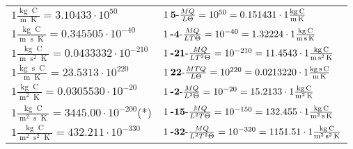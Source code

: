 \begin{center}
\begin{longtable}{l l}
{\color{black}$1 \bm{\mathrm{ }}\frac{\operatorname{kg}\operatorname{C}}{\operatorname{m}\operatorname{K}} = 3.10433\cdot10^{50} $}&
	{\color{black}$1\:\text{\textbf{5}-} \frac{MQ}{L\Theta}=10^{50} = 0.151431 \cdot 1 \bm{\mathrm{ }}\frac{\operatorname{kg}\operatorname{C}}{\operatorname{m}\operatorname{K}}$}\\
{\color{black}$1 \bm{\mathrm{ }}\frac{\operatorname{kg}\operatorname{C}}{\operatorname{m}\operatorname{s}\operatorname{K}} = 0.345505\cdot10^{-40} $}&
	{\color{black}$1\:\text{\textbf{-4}-} \frac{MQ}{LT\Theta}=10^{-40} = 1.32224 \cdot 1 \bm{\mathrm{ }}\frac{\operatorname{kg}\operatorname{C}}{\operatorname{m}\operatorname{s}\operatorname{K}}$}\\
{\color{black}$1 \bm{\mathrm{ }}\frac{\operatorname{kg}\operatorname{C}}{\operatorname{m}\operatorname{s}^2\operatorname{K}} = 0.0433332\cdot10^{-210} $}&
	{\color{black}$1\:\text{\textbf{-21}-} \frac{MQ}{LT^2\Theta}=10^{-210} = 11.4543 \cdot 1 \bm{\mathrm{ }}\frac{\operatorname{kg}\operatorname{C}}{\operatorname{m}\operatorname{s}^2\operatorname{K}}$}\\
{\color{black}$1 \bm{\mathrm{ }}\frac{\operatorname{kg}\operatorname{s}\operatorname{C}}{\operatorname{m}\operatorname{K}} = 23.5313\cdot10^{220} $}&
	{\color{black}$1\:\text{\textbf{22}-} \frac{MTQ}{L\Theta}=10^{220} = 0.0213220 \cdot 1 \bm{\mathrm{ }}\frac{\operatorname{kg}\operatorname{s}\operatorname{C}}{\operatorname{m}\operatorname{K}}$}\\
{\color{black}$1 \bm{\mathrm{ }}\frac{\operatorname{kg}\operatorname{C}}{\operatorname{m}^2\operatorname{K}} = 0.0305530\cdot10^{-20} $}&
	{\color{black}$1\:\text{\textbf{-2}-} \frac{MQ}{L^2\Theta}=10^{-20} = 15.2133 \cdot 1 \bm{\mathrm{ }}\frac{\operatorname{kg}\operatorname{C}}{\operatorname{m}^2\operatorname{K}}$}\\
{\color{black}$1 \bm{\mathrm{ }}\frac{\operatorname{kg}\operatorname{C}}{\operatorname{m}^2\operatorname{s}\operatorname{K}} = 3445.00\cdot10^{-200} $}\quad(*)&
	{\color{black}$1\:\text{\textbf{-15}-} \frac{MQ}{L^2T\Theta}=10^{-150} = 132.455 \cdot 1 \bm{\mathrm{ }}\frac{\operatorname{kg}\operatorname{C}}{\operatorname{m}^2\operatorname{s}\operatorname{K}}$}\\
{\color{black}$1 \bm{\mathrm{ }}\frac{\operatorname{kg}\operatorname{C}}{\operatorname{m}^2\operatorname{s}^2\operatorname{K}} = 432.211\cdot10^{-330} $}&
	{\color{black}$1\:\text{\textbf{-32}-} \frac{MQ}{L^2T^2\Theta}=10^{-320} = 1151.51 \cdot 1 \bm{\mathrm{ }}\frac{\operatorname{kg}\operatorname{C}}{\operatorname{m}^2\operatorname{s}^2\operatorname{K}}$}\\

\end{longtable}
\end{center}

